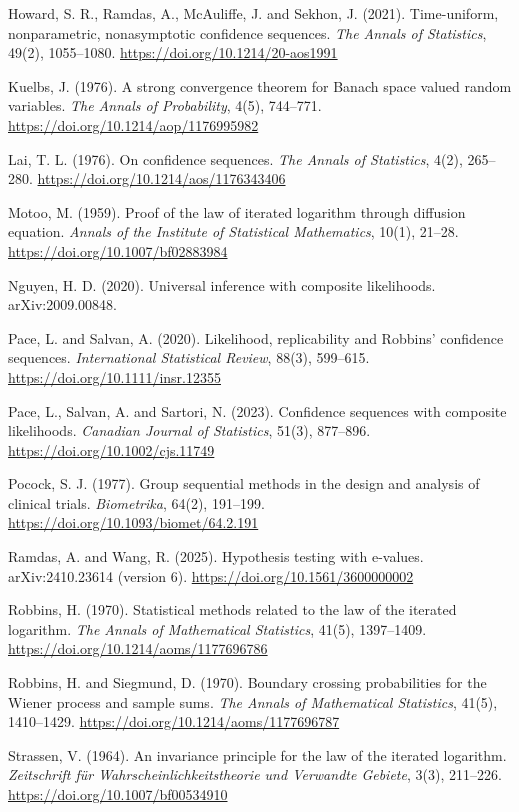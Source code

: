 \documentclass[
  10pt,
  a4paper,
]{article}
\begin{document}
Howard, S. R., Ramdas, A., McAuliffe, J. and Sekhon, J. (2021).
Time-uniform, nonparametric, nonasymptotic confidence sequences.
\emph{The Annals of Statistics}, 49(2), 1055--1080.
\url{https://doi.org/10.1214/20-aos1991}

Kuelbs, J. (1976). A strong convergence theorem for Banach space valued
random variables. \emph{The Annals of Probability}, 4(5), 744--771.
\url{https://doi.org/10.1214/aop/1176995982}

Lai, T. L. (1976). On confidence sequences. \emph{The Annals of
Statistics}, 4(2), 265--280.
\url{https://doi.org/10.1214/aos/1176343406}

Motoo, M. (1959). Proof of the law of iterated logarithm through
diffusion equation. \emph{Annals of the Institute of Statistical
Mathematics}, 10(1), 21--28. \url{https://doi.org/10.1007/bf02883984}

Nguyen, H. D. (2020). Universal inference with composite likelihoods.
arXiv:2009.00848.

Pace, L. and Salvan, A. (2020). Likelihood, replicability and Robbins'
confidence sequences. \emph{International Statistical Review}, 88(3),
599--615. \url{https://doi.org/10.1111/insr.12355}

Pace, L., Salvan, A. and Sartori, N. (2023). Confidence sequences with
composite likelihoods. \emph{Canadian Journal of Statistics}, 51(3),
877--896. \url{https://doi.org/10.1002/cjs.11749}

Pocock, S. J. (1977). Group sequential methods in the design and
analysis of clinical trials. \emph{Biometrika}, 64(2), 191--199.
\url{https://doi.org/10.1093/biomet/64.2.191}

Ramdas, A. and Wang, R. (2025). Hypothesis testing with e-values.
arXiv:2410.23614 (version 6). \url{https://doi.org/10.1561/3600000002}

Robbins, H. (1970). Statistical methods related to the law of the
iterated logarithm. \emph{The Annals of Mathematical Statistics}, 41(5),
1397--1409. \url{https://doi.org/10.1214/aoms/1177696786}

Robbins, H. and Siegmund, D. (1970). Boundary crossing probabilities for
the Wiener process and sample sums. \emph{The Annals of Mathematical
Statistics}, 41(5), 1410--1429.
\url{https://doi.org/10.1214/aoms/1177696787}

Strassen, V. (1964). An invariance principle for the law of the iterated
logarithm. \emph{Zeitschrift für Wahrscheinlichkeitstheorie und
Verwandte Gebiete}, 3(3), 211--226.
\url{https://doi.org/10.1007/bf00534910}
\end{document}
